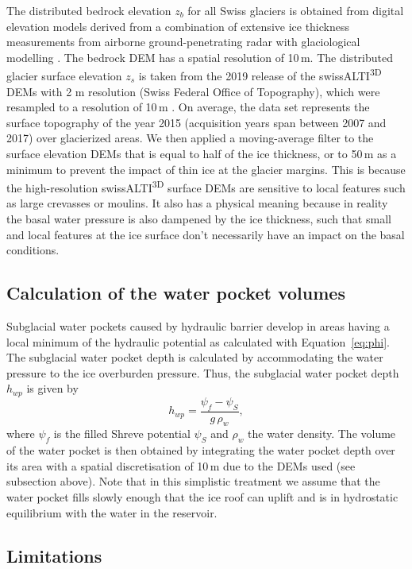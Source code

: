 The distributed bedrock elevation $z_b$ for all Swiss glaciers is obtained from digital elevation models derived from a combination of extensive ice thickness measurements from airborne ground-penetrating radar with glaciological modelling \citep{Grab&al2021}. The bedrock DEM has a spatial resolution of 10\,m. The distributed glacier surface elevation $z_s$ is taken from the 2019 release of the swissALTI\textsuperscript{3D} DEMs with 2 m resolution (Swiss Federal Office of Topography), which were resampled to a resolution of 10\,m \citep{Grab&al2021}. On average, the data set represents the surface topography of the year 2015 (acquisition years span between 2007 and 2017) over glacierized areas. We then applied a moving-average filter to the surface elevation DEMs that is equal to half of the ice thickness, or to 50\,m as a minimum to prevent the impact of thin ice at the glacier margins. This is because the high-resolution swissALTI\textsuperscript{3D} surface DEMs are sensitive to local features such as large crevasses or moulins. It also has a physical meaning because in reality the basal water pressure is also dampened by the ice thickness, such that small and local features at the ice surface don't necessarily have an impact on the basal conditions.


\subsection{ Calculation of the water pocket volumes}

Subglacial water pockets caused by hydraulic barrier develop in areas having a local minimum of the hydraulic potential as calculated with Equation~\ref{eq:phi}. The subglacial water pocket depth is calculated by accommodating the water pressure to the ice overburden pressure. Thus, the subglacial water pocket depth $h_{wp}$ is given by
%
\begin{equation}
     h_{wp} = \frac{\psi_{f} - \psi_{S}}{g\,\rho_w},
\end{equation}
%
where $\psi_{f}$ is the filled Shreve potential $\psi_S$ and $\rho_w$ the water density. The volume of the water pocket is then obtained by integrating the water pocket depth over its area with a spatial discretisation of 10\,m due to the DEMs used (see subsection above). Note that in this simplistic treatment we assume that the water pocket fills slowly enough that the ice roof can uplift and is in hydrostatic equilibrium with the water in the reservoir.
%

\subsection{ Limitations}

